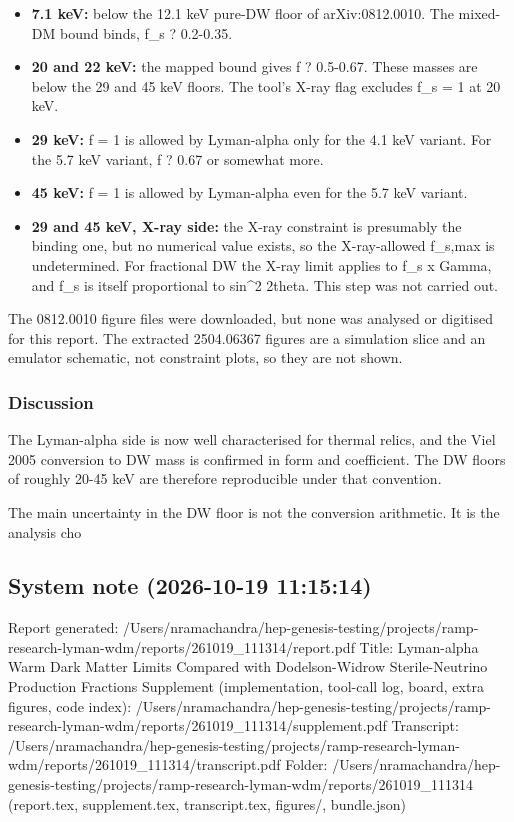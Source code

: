 \documentclass[11pt,a4paper]{article}
\begin{document}
\begin{itemize}
  \item \textbf{7.1 keV:} below the 12.1 keV pure-DW floor of arXiv:0812.0010. The mixed-DM bound binds, f\_s ? 0.2-0.35.
  \item \textbf{20 and 22 keV:} the mapped bound gives f ? 0.5-0.67. These masses are below the 29 and 45 keV floors. The tool's X-ray flag excludes f\_s = 1 at 20 keV.
  \item \textbf{29 keV:} f = 1 is allowed by Lyman-alpha only for the 4.1 keV variant. For the 5.7 keV variant, f ? 0.67 or somewhat more.
  \item \textbf{45 keV:} f = 1 is allowed by Lyman-alpha even for the 5.7 keV variant.
  \item \textbf{29 and 45 keV, X-ray side:} the X-ray constraint is presumably the binding one, but no numerical value exists, so the X-ray-allowed f\_s,max is undetermined. For fractional DW the X-ray limit applies to f\_s x Gamma, and f\_s is itself proportional to sin\textasciicircum{}2 2theta. This step was not carried out.
\end{itemize}
The 0812.0010 figure files were downloaded, but none was analysed or digitised for this report. The extracted 2504.06367 figures are a simulation slice and an emulator schematic, not constraint plots, so they are not shown.

\subsubsection*{Discussion}
The Lyman-alpha side is now well characterised for thermal relics, and the Viel 2005 conversion to DW mass is confirmed in form and coefficient. The DW floors of roughly 20-45 keV are therefore reproducible under that convention.

The main uncertainty in the DW floor is not the conversion arithmetic. It is the analysis cho

\subsection*{System note \small(2026-10-19 11:15:14)}
Report generated: /Users/nramachandra/hep-genesis-testing/projects/ramp-research-lyman-wdm/reports/261019\_111314/report.pdf Title: Lyman-alpha Warm Dark Matter Limits Compared with Dodelson-Widrow Sterile-Neutrino Production Fractions Supplement (implementation, tool-call log, board, extra figures, code index): /Users/nramachandra/hep-genesis-testing/projects/ramp-research-lyman-wdm/reports/261019\_111314/supplement.pdf Transcript: /Users/nramachandra/hep-genesis-testing/projects/ramp-research-lyman-wdm/reports/261019\_111314/transcript.pdf Folder: /Users/nramachandra/hep-genesis-testing/projects/ramp-research-lyman-wdm/reports/261019\_111314 (report.tex, supplement.tex, transcript.tex, figures/, bundle.json)
\end{document}
